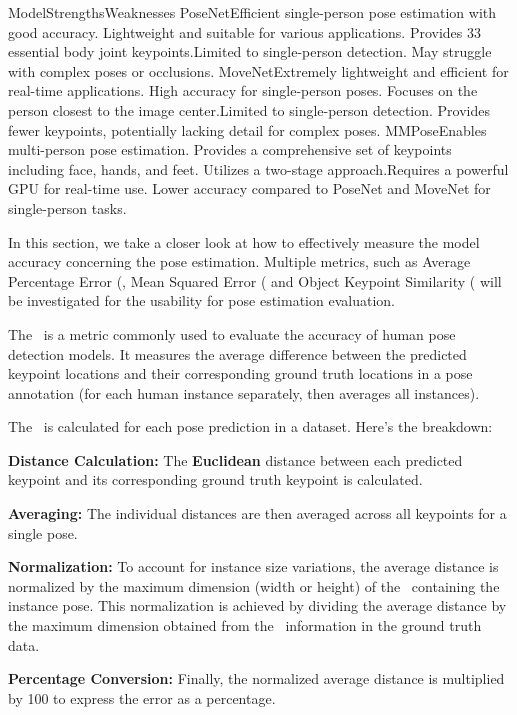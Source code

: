     \setupTABLE[r,c][1][style=bold]
    \setupTABLE[c][each][offset=3dd]
    \setupTABLE[frame=off]
    \setupTABLE[r][1][topframe=on,bottomframe=on]
    \setupTABLE[c][each][leftframe=on, align={middle,lohi}]
    \setupTABLE[c][1][leftframe=off]
    \bTR
        \bTD Model\eTD\bTD   Strengths\eTD\bTD Weaknesses\eTD\eTR
    \bTR
        \bTD PoseNet\eTD\bTD Efficient single-person pose estimation with good accuracy. Lightweight and suitable for various applications. Provides 33 essential body joint keypoints.\eTD\bTD Limited to single-person detection. May struggle with complex poses or occlusions.\eTD\eTR
    \bTR
        \bTD MoveNet\eTD\bTD Extremely lightweight and efficient for real-time applications. High accuracy for single-person poses. Focuses on the person closest to the image center.\eTD\bTD Limited to single-person detection. Provides fewer keypoints, potentially lacking detail for complex poses.\eTD\eTR
    \bTR
        \bTD MMPose\eTD\bTD  Enables multi-person pose estimation. Provides a comprehensive set of keypoints including face, hands, and feet. Utilizes a two-stage approach.\eTD\bTD Requires a powerful GPU for real-time use. Lower accuracy compared to PoseNet and MoveNet for single-person tasks.\eTD\eTR

In this section, we take a closer look at how to effectively measure the model accuracy concerning the pose estimation. Multiple metrics, such as Average Percentage Error (\APE\), Mean Squared Error (\MSE\) and Object Keypoint Similarity (\OKS\) will be investigated for the usability for pose estimation evaluation.

The \APE\ is a metric commonly used to evaluate the accuracy of human pose detection models. It measures the average difference between the predicted keypoint locations and their corresponding ground truth locations in a pose annotation (for each human instance separately, then averages all instances).

The \APE\ is calculated for each pose prediction in a dataset. Here's the breakdown:

\startitemize[n]
    \item {\bf Distance Calculation:} The {\bf Euclidean} distance between each predicted keypoint and its corresponding ground truth keypoint is calculated.
    \item {\bf Averaging:} The individual distances are then averaged across all keypoints for a single pose.
    \item {\bf Normalization:} To account for instance size variations, the average distance is normalized by the maximum dimension (width or height) of the \BBOX\ containing the instance pose. This normalization is achieved by dividing the average distance by the maximum dimension obtained from the \BBOX\ information in the ground truth data.
    \item {\bf Percentage Conversion:} Finally, the normalized average distance is multiplied by 100 to express the error as a percentage.
\stopitemize

